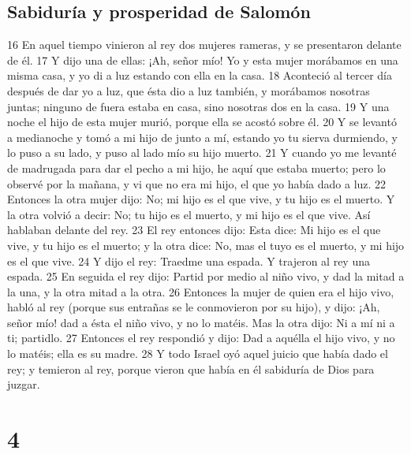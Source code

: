 \section*{Sabiduría y prosperidad de Salomón}

16 En aquel tiempo vinieron al rey dos mujeres rameras, y se presentaron delante de él.
17 Y dijo una de ellas: ¡Ah, señor mío! Yo y esta mujer morábamos en una misma casa, y yo di a luz estando con ella en la casa.
18 Aconteció al tercer día después de dar yo a luz, que ésta dio a luz también, y morábamos nosotras juntas; ninguno de fuera estaba en casa, sino nosotras dos en la casa.
19 Y una noche el hijo de esta mujer murió, porque ella se acostó sobre él.
20 Y se levantó a medianoche y tomó a mi hijo de junto a mí, estando yo tu sierva durmiendo, y lo puso a su lado, y puso al lado mío su hijo muerto.
21 Y cuando yo me levanté de madrugada para dar el pecho a mi hijo, he aquí que estaba muerto; pero lo observé por la mañana, y vi que no era mi hijo, el que yo había dado a luz.
22 Entonces la otra mujer dijo: No; mi hijo es el que vive, y tu hijo es el muerto. Y la otra volvió a decir: No; tu hijo es el muerto, y mi hijo es el que vive. Así hablaban delante del rey.
23 El rey entonces dijo: Esta dice: Mi hijo es el que vive, y tu hijo es el muerto; y la otra dice: No, mas el tuyo es el muerto, y mi hijo es el que vive.
24 Y dijo el rey: Traedme una espada. Y trajeron al rey una espada.
25 En seguida el rey dijo: Partid por medio al niño vivo, y dad la mitad a la una, y la otra mitad a la otra.
26 Entonces la mujer de quien era el hijo vivo, habló al rey (porque sus entrañas se le conmovieron por su hijo), y dijo: ¡Ah, señor mío! dad a ésta el niño vivo, y no lo matéis. Mas la otra dijo: Ni a mí ni a ti; partidlo.
27 Entonces el rey respondió y dijo: Dad a aquélla el hijo vivo, y no lo matéis; ella es su madre.
28 Y todo Israel oyó aquel juicio que había dado el rey; y temieron al rey, porque vieron que había en él sabiduría de Dios para juzgar.

\chapter{4}


